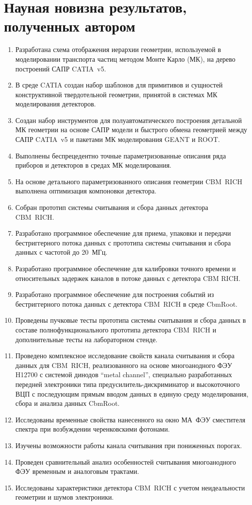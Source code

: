\section*{Науная новизна результатов, полученных автором}

\begin{enumerate}

\item Разработана схема отображения иерархии геометрии, используемой в моделировании транспорта частиц методом Монте Карло (МК), на дерево построений САПР CATIA~v5.
\item В среде CATIA создан набор шаблонов для примитивов и сущностей конструктивной твердотельной геометрии, принятой в системах МК моделирования детекторов.
\item Создан набор инструментов для полуавтоматического построения детальной МК геометрии на основе САПР модели и быстрого обмена геометрией между САПР CATIA~v5 и пакетами МК моделирования GEANT и ROOT.
\item Выполнены беспрецедентно точные параметризованные описания ряда приборов и детекторов в средах МК моделирования.
\item На основе детального параметризованного описания геометрии CBM~RICH выполнена оптимизация компоновки детектора. 
\item Собран прототип системы считывания и сбора данных детектора CBM~RICH.
\item Разработано программное обеспечение для приема, упаковки и передачи бестриггерного потока данных с прототипа системы считывания и сбора данных с частотой до 20~МГц.
\item Разработано программное обеспечение для калибровки точного времени и относительных задержек каналов в потоке данных с детектора CBM RICH.
\item Разработано программное обеспечение для построения событий из бестриггерного потока данных с детектора CBM~RICH в среде CbmRoot.
\item Проведены пучковые тесты прототипа системы считывания и сбора данных в составе полнофункционального прототипа детектора CBM~RICH и дополнительные тесты на лабораторном стенде. 
\item Проведено комплексное исследование свойств канала считывания и сбора данных для CBM~RICH, реализованного на основе многоанодного ФЭУ H12700 с системой динодов ``metal channel'', специально разработанных передней электроники типа предусилитель-дискриминатор и высокоточного ВЦП с последующим прямым вводом данных в единую среду моделирования, сбора и анализа данных CbmRoot.
\item Исследованы временные свойства нанесенного на окно МА~ФЭУ сместителя спектра при возбуждении черенковскими фотонами.
\item Изучены возможности работы канала считывания при пониженных порогах.
\item Проведен сравнительный анализ особенностей считывания многоанодного ФЭУ временным и аналоговым трактами.
\item Исследованы характеристики детектора CBM~RICH с учетом неидеальности геометрии и шумов электроники.

\end{enumerate}
